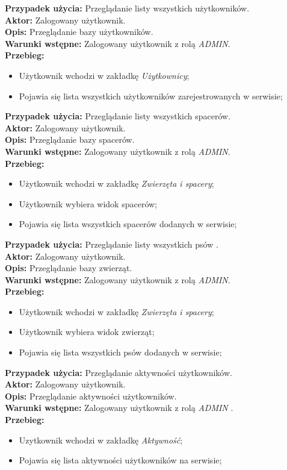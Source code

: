 \noindent
\textbf{Przypadek użycia:} Przeglądanie listy wszystkich użytkowników. \\
\textbf{Aktor:} Zalogowany użytkownik. \\
\textbf{Opis:} Przeglądanie bazy użytkowników. \\
\textbf{Warunki wstępne:} Zalogowany użytkownik z rolą \textit{ADMIN}. \\
\textbf{Przebieg:}
\begin{itemize}[leftmargin=1cm]
    \item Użytkownik wchodzi w zakładkę \textit{Użytkownicy};
    \item Pojawia się lista wszystkich użytkowników zarejestrowanych w serwisie;
\end{itemize}

\noindent
\textbf{Przypadek użycia:} Przeglądanie listy wszystkich spacerów. \\
\textbf{Aktor:} Zalogowany użytkownik. \\
\textbf{Opis:} Przeglądanie bazy spacerów. \\
\textbf{Warunki wstępne:} Zalogowany użytkownik z rolą \textit{ADMIN}. \\
\textbf{Przebieg:}
\begin{itemize}[leftmargin=1cm]
    \item Użytkownik wchodzi w zakładkę \textit{Zwierzęta i spacery};
    \item Użytkownik wybiera widok spacerów;
    \item Pojawia się lista wszystkich spacerów dodanych w serwisie;
\end{itemize}

\noindent
\textbf{Przypadek użycia:} Przeglądanie listy wszystkich psów . \\
\textbf{Aktor:} Zalogowany użytkownik. \\
\textbf{Opis:} Przeglądanie bazy zwierząt. \\
\textbf{Warunki wstępne:} Zalogowany użytkownik z rolą \textit{ADMIN}. \\
\textbf{Przebieg:}
\begin{itemize}[leftmargin=1cm]
    \item Użytkownik wchodzi w zakładkę \textit{Zwierzęta i spacery};
    \item Użytkownik wybiera widok zwierząt;
    \item Pojawia się lista wszystkich psów dodanych w serwisie;
\end{itemize}

\noindent
\textbf{Przypadek użycia:} Przeglądanie aktywności użytkowników. \\
\textbf{Aktor:} Zalogowany użytkownik. \\
\textbf{Opis:} Przeglądanie aktywności użytkowników. \\
\textbf{Warunki wstępne:} Zalogowany użytkownik z rolą \textit{ADMIN} . \\
\textbf{Przebieg:}
\begin{itemize}[leftmargin=1cm]
    \item Uzytkownik wchodzi w zakładkę \textit{Aktywność};
    \item Pojawia się lista aktywności użytkowników na serwisie;
\end{itemize}

